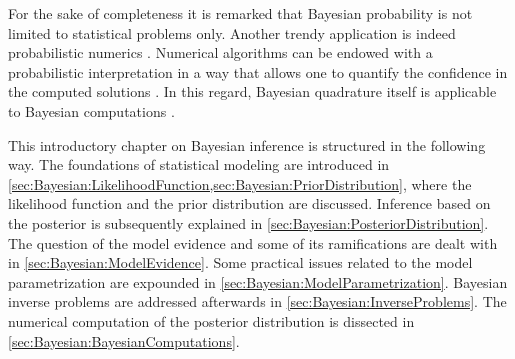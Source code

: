 \par %
For the sake of completeness it is remarked that Bayesian probability is not limited to statistical problems only.
Another trendy application is indeed probabilistic numerics \cite{Bayesian:Diaconis1988,BayesianOHagan1992}.
Numerical algorithms can be endowed with a probabilistic interpretation in a way that allows one to quantify the confidence in the computed solutions \cite{Bayesian:Hennig2015:b}.
In this regard, Bayesian quadrature \cite{Bayesian:OHagan1991,Bayesian:Kennedy1998} itself is applicable to Bayesian computations \cite{Bayesian:Osborne2012,Bayesian:Briol2015}.
\par %
This introductory chapter on Bayesian inference is structured in the following way.
The foundations of statistical modeling are introduced in \cref{sec:Bayesian:LikelihoodFunction,sec:Bayesian:PriorDistribution},
where the likelihood function and the prior distribution are discussed.
Inference based on the posterior is subsequently explained in \cref{sec:Bayesian:PosteriorDistribution}.
The question of the model evidence and some of its ramifications are dealt with in \cref{sec:Bayesian:ModelEvidence}.
Some practical issues related to the model parametrization are expounded in \cref{sec:Bayesian:ModelParametrization}.
Bayesian inverse problems are addressed afterwards in \cref{sec:Bayesian:InverseProblems}.
The numerical computation of the posterior distribution is dissected in \cref{sec:Bayesian:BayesianComputations}.